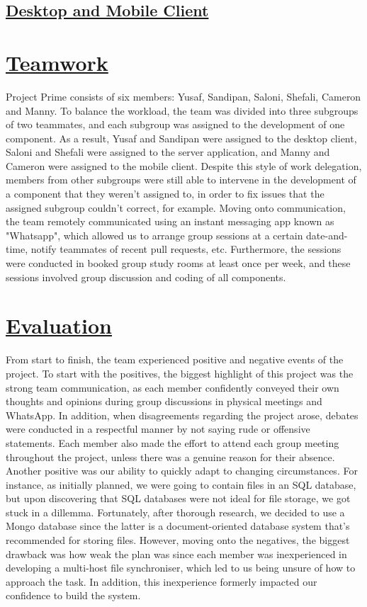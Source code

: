 \documentclass{article}
\begin{document}
\subsection{\underline{Desktop and Mobile Client}}

\section{\underline{Teamwork}}
Project Prime consists of six members: Yusaf, Sandipan, Saloni, Shefali, Cameron and Manny. To balance the workload, the team was divided into three subgroups of two teammates, and each subgroup was assigned to the development of one component. As a result, Yusaf and Sandipan were assigned to the desktop client, Saloni and Shefali were assigned to the server application, and Manny and Cameron were assigned to the mobile client. Despite this style of work delegation, members from other subgroups were still able to intervene in the development of a component that they weren't assigned to, in order to fix issues that the assigned subgroup couldn't correct, for example. Moving onto communication, the team remotely communicated using an instant messaging app known as "Whatsapp", which allowed us to arrange group sessions at a certain date-and-time, notify teammates of recent pull requests, etc. Furthermore, the sessions were conducted in booked group study rooms at least once per week, and these sessions involved group discussion and coding of all components. 

\section{\underline{Evaluation}}
From start to finish, the team experienced  positive and negative events of the project. To start with the positives, the biggest highlight of this project was the strong team communication, as each member confidently conveyed their own thoughts and opinions during group discussions in physical meetings and WhatsApp. In addition, when disagreements regarding the project arose, debates were conducted in a respectful manner by not saying rude or offensive statements. Each member also made the effort to attend each group meeting throughout the project, unless there was a genuine reason for their absence. Another positive was our ability to quickly adapt to changing circumstances. For instance, as initially planned, we were going to contain files in an SQL database, but upon discovering that SQL databases were not ideal for file storage, we got stuck in a dillemma. Fortunately, after thorough research, we decided to use a Mongo database since the latter is a document-oriented database system that's recommended for storing files. However, moving onto the negatives, the biggest drawback was how weak the plan was since each member was inexperienced in developing a multi-host file synchroniser, which led to us being unsure of how to approach the task. In addition, this inexperience formerly impacted our confidence to build the system.
\end{document}
